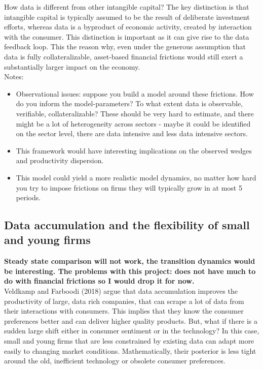 \documentclass[12pt]{article}
\begin{document}
How data is different from other intangible capital? The key distinction is that intangible capital is typically assumed to be the result of deliberate investment efforts, whereas data is a byproduct of economic activity, created by interaction with the consumer. This distinction is important as it can give rise to the data feedback loop. This the reason why, even under the generous assumption that data is fully collateralizable, asset-based financial frictions would still exert a substantially larger impact on the economy. \vspace{3mm} \\

\noindent Notes: 
\begin{itemize}
	\item Observational issues: suppose you build a model around these frictions. How do you inform the model-parameters? To what extent data is observable, verifiable, collateralizable? These should be very hard to estimate, and there might be a lot of heterogeneity across sectors - maybe it could be identified on the sector level, there are data intensive and less data intensive sectors.
	\item This framework would have interesting implications on the observed wedges and productivity dispersion. 
	\item This model could yield a more realistic model dynamics, no matter how hard you try to impose frictions on firms they will typically grow in at most 5 periods. 

\end{itemize}

\subsection*{Data accumulation and the flexibility of small and young firms} 

\textbf{Steady state comparison will not work, the transition dynamics would be interesting. The problems with this project: does not have much to do with financial frictions so I would drop it for now.} \vspace{3mm} \\
Veldkamp and Farboodi (2018) argue that data accumulation improves the productivity of large, data rich companies, that can scrape a lot of data from their interactions with consumers. This implies that they know the consumer preferences better and can deliver higher quality products. But, what if there is a sudden large shift either in consumer sentiment or in the technology? In this case, small and young firms that are less constrained by existing data can adapt more easily to changing market conditions. Mathematically, their posterior is less tight around the old, inefficient technology or obsolete consumer preferences.  
\end{document}
